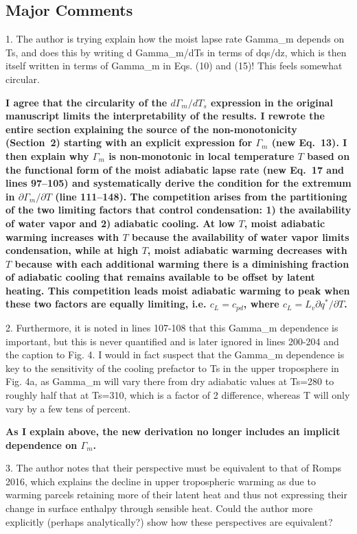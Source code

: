 \documentclass{article}
\begin{document}
\subsection{Major Comments}

1. The author is trying explain how the moist lapse rate Gamma\_m depends on Ts, and does this by writing d Gamma\_m/dTs in terms of dqs/dz, which is then itself written in terms of  Gamma\_m in Eqs. (10) and (15)! This feels somewhat circular.
\par
\textbf{\textbf{I agree that the circularity of the $d\Gamma_m/dT_s$ expression in the original manuscript limits the interpretability of the results. I rewrote the entire section explaining the source of the non-monotonicity (Section~2) starting with an explicit expression for $\Gamma_m$ (new Eq.~13). I then explain why $\Gamma_m$ is non-monotonic in local temperature $T$ based on the functional form of the moist adiabatic lapse rate (new Eq.~17 and lines 97--105) and systematically derive the condition for the extremum in $\partial\Gamma_m/\partial T$ (line 111--148). The competition arises from the partitioning of the two limiting factors that control condensation: 1) the availability of water vapor and 2) adiabatic cooling. At low $T$, moist adiabatic warming increases with $T$ because the availability of water vapor limits condensation, while at high $T$, moist adiabatic warming decreases with $T$ because with each additional warming there is a diminishing fraction of adiabatic cooling that remains available to be offset by latent heating. This competition leads moist adiabatic warming to peak when these two factors are equally limiting, i.e. $c_L = c_{pd}$, where $c_L=L_v\partial q^*/\partial T$.}}
\par
2. Furthermore, it is noted in lines 107-108 that this Gamma\_m dependence is important, but this is never quantified and is later ignored in lines 200-204 and the caption to Fig. 4. I would in fact suspect that the Gamma\_m dependence is key to the sensitivity of the cooling prefactor to Ts in the upper troposphere in Fig. 4a, as  Gamma\_m will vary there from dry adiabatic values at Ts=280 to roughly half that at Ts=310, which is a factor of 2 difference, whereas T will only vary by a few tens of percent.
\par
\textbf{As I explain above, the new derivation no longer includes an implicit dependence on $\Gamma_m$.}
\par
3. The author notes that their perspective must be equivalent to that of Romps 2016, which explains the decline in upper tropospheric warming as due to warming parcels retaining more of their latent heat and thus not expressing their change in surface enthalpy through sensible heat. Could the author more explicitly (perhaps analytically?) show how these perspectives are equivalent?
\end{document}
